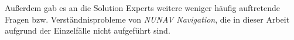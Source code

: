 
Außerdem gab es an die \glqq Solution Experts\grqq{} weitere weniger häufig auftretende Fragen bzw. Verständnisprobleme von \textit{NUNAV Navigation}, die in dieser Arbeit aufgrund der Einzelfälle nicht aufgeführt sind.

